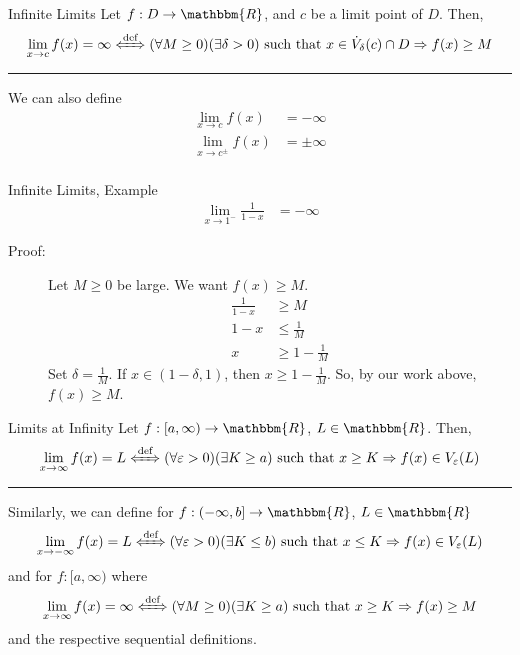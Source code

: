 \documentclass[10pt]{extarticle}
\newcommand{\R}{\mathbbm{R}}
\begin{document}
  \begin{problem}{Infinite Limits}
    Let $f: D\rightarrow \R$, and $c$ be a limit point of $D$. Then,
    \begin{align*}
      \lim_{x\rightarrow c}f(x) = \infty \xLeftrightarrow{\text{def}} (\forall M \geq 0)(\exists \delta > 0) \text{ such that } x\in \dot{V}_{\delta}(c)\cap D \Rightarrow f(x) \geq M
    \end{align*}
    \vspace{4pt}
    \rule{\textwidth}{0.4pt}
    \vspace{4pt}
    We can also define
    \begin{align*}
      \lim_{x\rightarrow c}f(x) &= -\infty\\
      \lim_{x\rightarrow c^{\pm}}f(x) &= \pm \infty\\
    \end{align*}
  \end{problem}
  \begin{problem}{Infinite Limits, Example}
    \begin{align*}
      \lim_{x\rightarrow 1^{-}}\frac{1}{1-x} &= -\infty
    \end{align*}
    \begin{description}
      \item[Proof:] Let $M\geq 0$ be large. We want $f(x) \geq M$.
        \begin{align*}
          \frac{1}{1-x} &\geq M\\
          1-x &\leq \frac{1}{M}\\
          x &\geq 1-\frac{1}{M}
        \end{align*}
        Set $\delta = \frac{1}{M}$. If $x\in (1-\delta,1)$, then $x\geq 1-\frac{1}{M}$. So, by our work above, $f(x) \geq M$.
    \end{description}
  \end{problem}
  \begin{problem}{Limits at Infinity}
    Let $f: [a,\infty) \rightarrow \R$, $L\in\R$. Then,
    \begin{align*}
      \lim_{x\rightarrow \infty}f(x) = L \xLeftrightarrow{\text{def}} (\forall \varepsilon > 0)(\exists K \geq a) \text{ such that } x\geq K \Rightarrow f(x)\in V_{\varepsilon}(L)
    \end{align*}
    \vspace{4pt}
    \rule{\textwidth}{0.4pt}
    \vspace{4pt}
    Similarly, we can define for $f: (-\infty,b] \rightarrow \R$, $L\in \R$
    \begin{align*}
      \lim_{x\rightarrow -\infty} f(x) = L \xLeftrightarrow{\text{def}} (\forall \varepsilon > 0)(\exists K\leq b) \text{ such that } x\leq K \Rightarrow f(x)\in V_{\varepsilon}(L)
    \end{align*}
    and for $f: [a,\infty)$ where
    \begin{align*}
      \lim_{x\rightarrow\infty}f(x) = \infty \xLeftrightarrow{\text{def}} (\forall M \geq 0)(\exists K\geq a) \text{ such that } x\geq K \Rightarrow f(x) \geq M
    \end{align*}
    and the respective sequential definitions.
  \end{problem}
\end{document}
